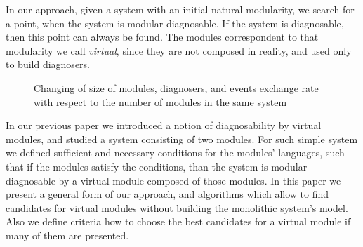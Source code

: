\documentclass[a4paper, 10pt, conference]{ieeeconf}
\begin{document}
In our approach, given a system with an initial natural modularity, we search
for a point, when the system is modular diagnosable. If the system is diagnosable,
then this point can always be found. The modules correspondent to that
modularity we call \emph{virtual}, since they are not composed in reality, and
used only to build diagnosers.

\begin{figure}
\caption{Changing of size of modules, diagnosers, and events exchange rate
with respect to the number of modules in the same system}
\label{fig:curves}
\end{figure}

In our previous paper \cite{myadzelets_virtual_2013} we introduced a notion of
diagnosability by virtual modules, and studied a system consisting of
two modules. For such simple system we defined sufficient and necessary
conditions for the modules' languages, such that if the modules satisfy the
conditions, than the system is modular diagnosable by a virtual module composed
of those modules. In this paper we present a general form of our approach, and
algorithms which allow to find candidates for virtual modules without
building the monolithic system's model. Also we define criteria how to choose
the best candidates for a virtual module if many of them are presented. 
\end{document}
